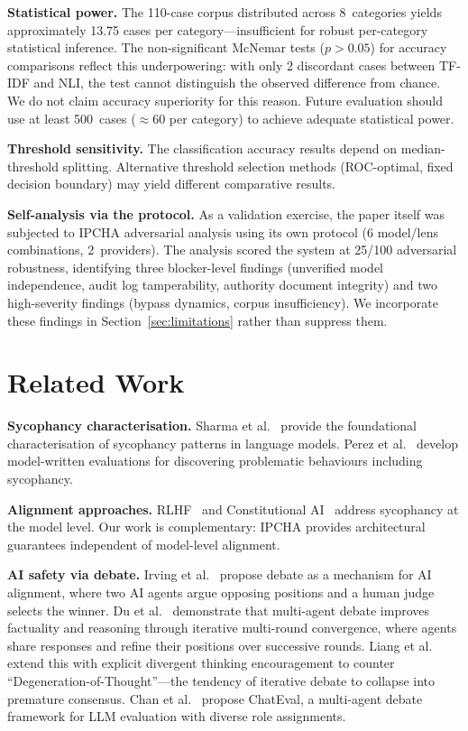 \documentclass[11pt,a4paper]{article}
\begin{document}
\textbf{Statistical power.}  The 110-case corpus distributed across
8~categories yields approximately 13.75 cases per category---insufficient
for robust per-category statistical inference.  The non-significant
McNemar tests ($p > 0.05$) for accuracy comparisons reflect this
underpowering: with only 2 discordant cases between TF-IDF and NLI,
the test cannot distinguish the observed difference from chance.  We
do not claim accuracy superiority for this reason.  Future evaluation
should use at least 500~cases (${\approx}60$ per category) to achieve
adequate statistical power.

\textbf{Threshold sensitivity.}  The classification accuracy results
depend on median-threshold splitting.  Alternative threshold
selection methods (ROC-optimal, fixed decision boundary) may yield
different comparative results.

\textbf{Self-analysis via the protocol.}  As a validation exercise,
the paper itself was subjected to IPCHA adversarial analysis using
its own protocol (6 model/lens combinations, 2~providers).  The
analysis scored the system at 25/100 adversarial robustness,
identifying three blocker-level findings (unverified model
independence, audit log tamperability, authority document integrity)
and two high-severity findings (bypass dynamics, corpus
insufficiency).  We incorporate these findings in
Section~\ref{sec:limitations} rather than suppress them.

\section{Related Work}\label{sec:related}

\textbf{Sycophancy characterisation.}
Sharma et al.~\cite{sharma2024sycophancy} provide the foundational
characterisation of sycophancy patterns in language models.
Perez et al.~\cite{perez2023discovering} develop model-written
evaluations for discovering problematic behaviours including
sycophancy.

\textbf{Alignment approaches.}
RLHF~\cite{christiano2017rlhf} and Constitutional
AI~\cite{bai2022constitutional} address sycophancy at the model
level.  Our work is complementary: IPCHA provides architectural
guarantees independent of model-level alignment.

\textbf{AI safety via debate.}
Irving et al.~\cite{irving2018debate} propose debate as a mechanism
for AI alignment, where two AI agents argue opposing positions and a
human judge selects the winner.
Du et al.~\cite{du2024multiagent} demonstrate that multi-agent debate
improves factuality and reasoning through iterative multi-round
convergence, where agents share responses and refine their positions
over successive rounds.
Liang et al.~\cite{liang2023divergent} extend this with explicit
divergent thinking encouragement to counter
``Degeneration-of-Thought''---the tendency of iterative debate to
collapse into premature consensus.
Chan et al.~\cite{chan2024chateval} propose ChatEval, a multi-agent
debate framework for LLM evaluation with diverse role assignments.
\end{document}
